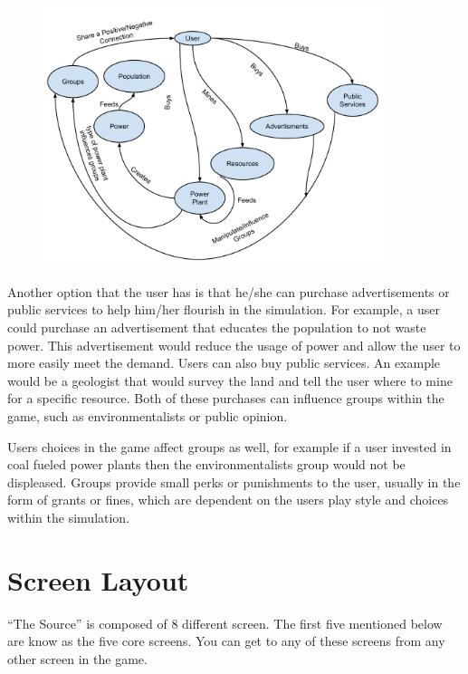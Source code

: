 \documentclass[msc,oneside]{ubcthesis}%
\begin{document}
\begin{figure}[hbt]
  \begin{center}
    \includegraphics[width=0.9\textwidth]{DFDDiagram}
    \caption[Figure 1]{\label{DFD Diagram} }
  \end{center}
\end{figure}


Another option that the user has is that he/she can purchase advertisements or public services to help 
him/her flourish in the simulation. For example, a user could purchase an advertisement that educates the 
population to not waste power. This advertisement would reduce the usage of power and allow the user to 
more easily meet the demand. Users can also buy public services. An example would be a geologist that would 
survey the land and tell the user where to mine for a specific resource. Both of these purchases can 
influence groups within the game, such as environmentalists or public opinion. 
\bigskip


Users choices in the game affect groups as well, for example if a user invested in coal fueled power plants then the environmentalists group would not be displeased. Groups provide small perks or punishments to the user, usually in the form of grants or fines, which are dependent on the users play style and choices within the simulation. 


\section{Screen Layout}
“The Source” is composed of 8 different screen. The first five mentioned below are know as the five core screens. You can get to any of these screens from any other screen in the game. 
\bigskip
\end{document}
